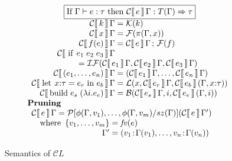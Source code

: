 \documentclass[sigplan,review]{acmart}
\newcommand{\KC}[2]{{\mathcal C}\lb \, #1 \, \rb\,#2}
\newcommand{\CatLang}{$\mathcal CL$}
\newcommand{\clcomp}{\, ; \,}   %
\newcommand{\ck}[1]{{\mathcal K}(#1)}   %
\newcommand{\cprune}[2]{\mathcal{P}[#1/#2]}   %
\newcommand{\cfun}[1]{{\mathcal F}(#1)}   %
\newcommand{\clet}[3]{{\mathcal L}(#1,#2,#3)}   %
\newcommand{\cbuild}[3]{{\mathcal B}(#1,#2,#3)}   %
\newcommand{\cif}[3]{\mathcal{IF}(#1,#2,#3)}   %
\newcommand{\lb}{\llbracket}
\newcommand{\rb}{\rrbracket}
\newcommand{\sizefun}{sz}
\newcommand{\tcolon}{\!:\!}
\newcommand{\darrow}{\Rightarrow}    %
\begin{document}
\begin{figure}
{\begin{minipage}{\columnwidth}
$$\begin{array}{l}
\begin{array}{r@{\hspace{1mm}}c@{\hspace{1mm}}l}
\multicolumn{3}{c}{\fbox{If $\Gamma \vdash e:\tau$ then $\KC{e}\Gamma : T(\Gamma) \darrow \tau$}} \\
  \KC{k}{\Gamma} & = & \ck{k} \\
  \KC{x}{\Gamma} & = & \cfun{\pi(\Gamma,x)} \\
  \KC{f(e)}{\Gamma} & = & \KC{e}{\Gamma} \clcomp \cfun{f} \\
  \KC{\lstinline|if|\;e_1\;e_2\;e_3}{\Gamma} \\
     \multicolumn{3}{l}{\hspace{2cm} = \cif{\KC{e_1}{\Gamma}}{\KC{e_2}{\Gamma}}{\KC{e_3}{\Gamma}}} \\
  \KC{(e_1, \ldots, e_n)}{\Gamma} & = & (\KC{e_1}{\Gamma}, \ldots, \KC{e_n}{\Gamma}) \\
  \KC{\lstinline|let|\;x{:}\tau = e_r \;\lstinline|in|\; e_b}{\Gamma} & = & \clet{x}{\KC{e_r}{\Gamma}}{\KC{e_b}{(\Gamma,x{:}\tau)}} \\
  \KC{\lstinline|build|\;e_s\;(\lambda i.e_e)}{\Gamma} & = & \cbuild{\KC{e_s}{\Gamma}}{i}{\KC{e_e}{(\Gamma,i)}}
\end{array}
\\[1mm]
\mbox{\bf Pruning} \\
\begin{array}{r@{\hspace{1mm}}c@{\hspace{1mm}}l}
  \KC{e}\Gamma & = & \cprune{\phi(\Gamma,v_1), \ldots, \phi(\Gamma, v_m)}{\sizefun(\Gamma)}(\KC{e}{\Gamma'}) \\
  \multicolumn{3}{l}{\quad \mbox{where}
    $\begin{array}[t]{r@{\hspace{1mm}}c@{\hspace{1mm}}l}
        \{v_1, \ldots, v_m\} & = & \mathit{fv}(e) \\
        \Gamma' & = & (v_1\tcolon\Gamma(v_1), \ldots, v_n\tcolon\Gamma(v_n))
      \end{array}$} \\
\end{array}
\end{array}
$$
\end{minipage}}
\caption{Semantics of \CatLang} \label{fig:cl-semantics}
\end{figure}
\end{document}
